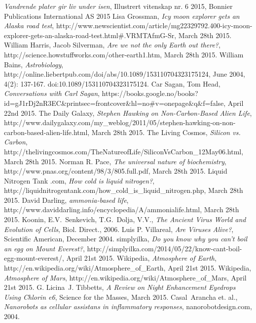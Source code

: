 \begin{thebibliography}{99}
		\emph{Vandrende plater gir liv under isen},
		Illustrert vitenskap nr. 6 2015,
		Bonnier Publications International AS
		2015
		Lisa Grossman,
		\emph{Icy moon explorer gets an Alaska road test},
		http://www.newscientist.com/article/mg22329792.400-icy-moon-explorer-gets-an-alaska-road-test.html\#.VRMTAfmG-Sr,
		March 28th 2015.
		William Harris, Jacob Silverman,
		\emph{Are we not the only Earth out there?},
		http://science.howstuffworks.com/other-earth1.htm,
		March 28th 2015.
		William Bains,
		\emph{Astrobiology},
		http://online.liebertpub.com/doi/abs/10.1089/153110704323175124,
		June 2004, 4(2): 137-167. doi:10.1089/153110704323175124.
		Car Sagan, Tom Head,
		\emph{Conversations with Carl Sagan},
		https://books.google.no/books?id=gJ1rDj2nR3EC\&printsec=frontcover\&hl=no\#v=onepage\&q\&f=false,
		April 22nd 2015.
		The Daily Galaxy,
		\emph{Stephen Hawking on Non-Carbon-Based Alien Life},
		http://www.dailygalaxy.com/my\_weblog/2011/05/stephen-hawking-on-non-carbon-based-alien-life.html,
		March 28th 2015.
		The Living Cosmos,
		\emph{Silicon vs. Carbon},
		http://thelivingcosmos.com/TheNatureofLife/SiliconVsCarbon\_12May06.html,
		March 28th 2015.
		Norman R. Pace,
		\emph{The universal nature of biochemistry},
		http://www.pnas.org/content/98/3/805.full.pdf,
		March 28th 2015.
		Liquid Nitrogen Tank .com,
		\emph{How cold is liquid nitrogen?},
		http://liquidnitrogentank.com/how\_cold\_is\_liquid\_nitrogen.php,
		March 28th 2015.
		David Darling,
		\emph{ammonia-based life},
		http://www.daviddarling.info/encyclopedia/A/ammonialife.html,
		March 28th 2015.
		Koonin, E.V.\, Senkevich, T.G.\, Dolja, V.V.,
		\emph{The Ancient Virus World and Evolution of Cells},
		Biol. Direct.,
		2006.
		Luis P. Villareal,
		\emph{Are Viruses Alive?},
		Scientific American,
		December 2004.
		simplyilka,
		\emph{Do you know why you can’t boil an egg on Mount Everest?},
		http://simplyilka.com/2014/05/22/know-cant-boil-egg-mount-everest/,
		April 21st 2015.
		Wikipedia,
		\emph{Atmosphere of Earth},
		http://en.wikipedia.org/wiki/Atmosphere\_of\_Earth,
		April 21st 2015.
		Wikipedia,
		\emph{Atmosphere of Mars},
		http://en.wikipedia.org/wiki/Atmosphere\_of\_Mars,
		April 21st 2015.
		G. Licina\, J. Tibbetts,
		\emph{A Review on Night Enhancement Eyedrops Using Chlorin e6},
		Science for the Masses,
		March 2015.
		Casal\, Arancha et. al.,
		\emph{Nanorobots as cellular assistans in inflammatory responses},
		nanorobotdesign.com,
		2004.
\end{thebibliography}